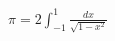 \documentclass[preview]{standalone}
\begin{document}
\begin{align*}
\pi = 2 \int_{-1}^{1} \frac{dx}{\sqrt{1 - x^2}}
\end{align*}
\end{document}
